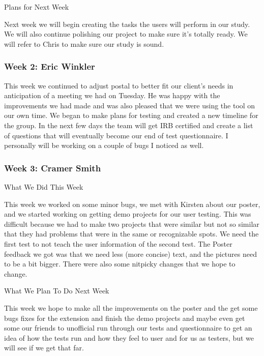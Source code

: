 Plans for Next Week

Next week we will begin creating the tasks the users will perform in our study. We will also continue polishing our project to make sure it's totally ready. We will refer to Chris to make sure our study is sound. \\ 

 \subsubsection{Week 2: Eric Winkler}

This week we continued to adjust postal to better fit our client's needs in anticipation of a meeting we had on Tuesday. He was happy with the improvements we had made and was also pleased that we were using the tool on our own time. We began to make plans for testing and created a new timeline for the group. In the next few days the team will get IRB certified and create a list of questions that will eventually become our end of test questionnaire. I personally will be working on a couple of bugs I noticed as well. \\ 

 \subsubsection{Week 3: Cramer Smith}

What We Did This Week



This week we worked on some minor bugs, we met with Kirsten about our poster, and we started working on getting demo projects for our user testing. This was difficult because we had to make two projects that were similar but not so similar that they had problems that were in the same or recognizable spots. We need the first test to not teach the user information of the second test. The Poster feedback we got was that we need less (more concise) text, and the pictures need to be a bit bigger. There were also some nitpicky changes that we hope to change.



What We Plan To Do Next Week



This week we hope to make all the improvements on the poster and the get some bugs fixes for the extension and finish the demo projects and maybe even get some our friends to unofficial run through our tests and questionnaire to get an idea of how the tests run and how they feel to user and for us as testers, but we will see if we get that far. \\ 

